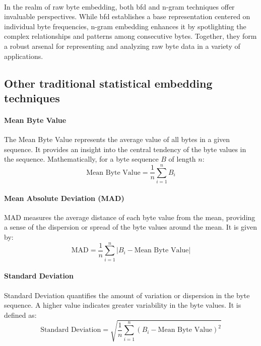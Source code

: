         \paragraph{}In the realm of raw byte embedding, both \acrshort{bfd} and n-gram techniques offer invaluable perspectives. While \acrshort{bfd} establishes a base representation centered on individual byte frequencies, n-gram embedding enhances it by spotlighting the complex relationships and patterns among consecutive bytes. Together, they form a robust arsenal for representing and analyzing raw byte data in a variety of applications.
    \subsection{Other traditional statistical embedding techniques}
        \paragraph{Mean Byte Value}The Mean Byte Value represents the average value of all bytes in a given sequence. It provides an insight into the central tendency of the byte values in the sequence. Mathematically, for a byte sequence \( B \) of length \( n \):
        \begin{equation}
        \text{Mean Byte Value} = \frac{1}{n} \sum_{i=1}^{n} B_i
        \label{eq:mean_byte_value}
        \end{equation}

        \paragraph{Mean Absolute Deviation (MAD)}MAD measures the average distance of each byte value from the mean, providing a sense of the dispersion or spread of the byte values around the mean. It is given by:
        \begin{equation}
        \text{MAD} = \frac{1}{n} \sum_{i=1}^{n} |B_i - \text{Mean Byte Value}|
        \label{eq:mad}
        \end{equation}

        \paragraph{Standard Deviation}Standard Deviation quantifies the amount of variation or dispersion in the byte sequence. A higher value indicates greater variability in the byte values. It is defined as:
        \begin{equation}
        \text{Standard Deviation} = \sqrt{\frac{1}{n} \sum_{i=1}^{n} (B_i - \text{Mean Byte Value})^2}
        \label{eq:standard_deviation}
        \end{equation}

